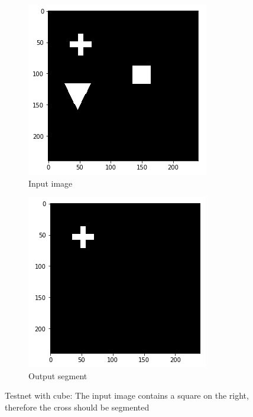 \begin{figure}[H]
    \centering
    \begin{subfigure}{.5\textwidth}
        \centering
        \includegraphics[width=\linewidth]{chapters/05_testnet/images/testnet_b-0.png}
        \caption{Input image}
    \end{subfigure}%
    \begin{subfigure}{.5\textwidth}
        \centering
        \includegraphics[width=\linewidth]{chapters/05_testnet/images/testnet_b-1.png}
        \caption{Output segment}
    \end{subfigure}
    \caption{Testnet with cube: The input image contains a square on the right, therefore the cross should be segmented}
    \label{testnet_example_2}
\end{figure}

